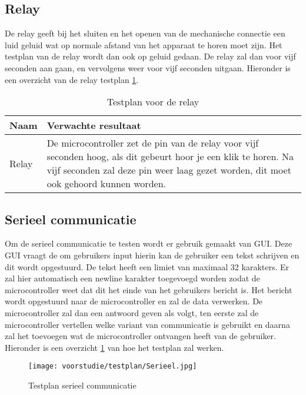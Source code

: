 \subsection{Relay}
De relay geeft bij het sluiten en het openen van de mechanische connectie een luid geluid wat op normale afstand van het apparaat te horen moet zijn. Het testplan van de relay wordt dan ook op geluid gedaan. De relay zal dan voor vijf seconden aan gaan, en vervolgens weer voor vijf seconden uitgaan. Hieronder is een overzicht van de relay testplan \ref{tab:hw_val_relay_testplan}.

\begin{table}[h!]
	\caption{Testplan voor de relay}
	\begin{tabular}{lp{14.5cm}}
	\toprule
	\textbf{Naam} 	& \textbf{Verwachte resultaat} \\ \toprule
	Relay			& De microcontroller zet de pin van de relay voor vijf seconden hoog, als dit gebeurt hoor je een klik te horen. Na vijf seconden zal deze pin weer laag gezet worden, dit moet ook gehoord kunnen worden.\\  \bottomrule
	\end{tabular}
	\label{tab:hw_val_relay_testplan}
\end{table}


\subsection{Serieel communicatie}
Om de serieel communicatie te testen wordt er gebruik gemaakt van GUI. Deze GUI vraagt de om gebruikers input hierin kan de gebruiker een tekst schrijven en dit wordt opgestuurd. De tekst heeft een limiet van maximaal 32 karakters. Er zal hier automatisch een newline karakter toegevoegd worden zodat de microcontroller weet dat dit het einde van het gebruikers bericht is. Het bericht wordt opgestuurd naar de microcontroller en zal de data verwerken. De microcontroller zal dan een antwoord geven als volgt, ten eerste zal de microcontroller vertellen welke variant van communicatie is gebruikt en daarna zal het toevoegen wat de microcontroller ontvangen heeft van de gebruiker. Hieronder is een overzicht \ref{fig:testplanserieel} van hoe het testplan zal werken.

\begin{figure}[h!]
	\centering
	\caption{Testplan serieel communicatie}
	\label{fig:testplanserieel}
	\texttt{[image: voorstudie/testplan/Serieel.jpg]}
\end{figure}

